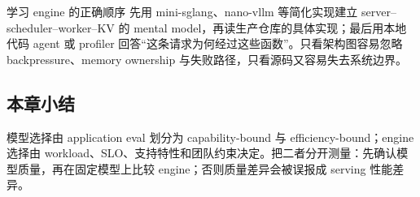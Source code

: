 
\begin{importantbox}{学习 engine 的正确顺序}
先用 mini-sglang、nano-vllm 等简化实现建立 server--scheduler--worker--KV 的 mental model，再读生产仓库的具体实现；最后用本地代码 agent 或 profiler 回答“这条请求为何经过这些函数”。只看架构图容易忽略 backpressure、memory ownership 与失败路径，只看源码又容易失去系统边界。
\end{importantbox}

\subsection{本章小结}

模型选择由 application eval 划分为 capability-bound 与 efficiency-bound；engine 选择由 workload、SLO、支持特性和团队约束决定。把二者分开测量：先确认模型质量，再在固定模型上比较 engine；否则质量差异会被误报成 serving 性能差异。

